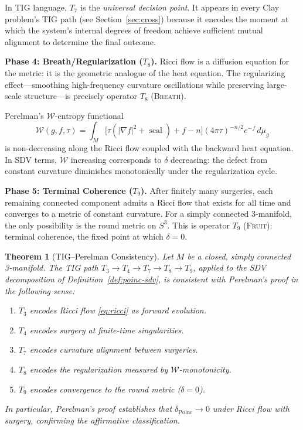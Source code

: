\documentclass[11pt]{article}
\newtheorem{theorem}{Theorem}[section]
\DeclareMathOperator{\scal}{scal}
\begin{document}
In TIG language, $T_7$ is the \emph{universal decision point}.  It
appears in every Clay problem's TIG path (see Section~\ref{sec:cross})
because it encodes the moment at which the system's internal degrees
of freedom achieve sufficient mutual alignment to determine the final
outcome.

\medskip
\noindent
\textbf{Phase 4: Breath/Regularization ($T_8$).}
Ricci flow is a diffusion equation for the metric: it is the geometric
analogue of the heat equation.  The regularizing effect---smoothing
high-frequency curvature oscillations while preserving large-scale
structure---is precisely operator $T_8$ (\textsc{Breath}).

Perelman's $\mathcal{W}$-entropy functional \cite{Per1}
\begin{equation}
\label{eq:W}
\mathcal{W}(g, f, \tau) = \int_M
\bigl[\tau(|\nabla f|^2 + \scal) + f - n\bigr]
(4\pi\tau)^{-n/2} e^{-f}\, d\mu_g
\end{equation}
is non-decreasing along the Ricci flow coupled with the backward heat
equation.  In SDV terms, $\mathcal{W}$ increasing corresponds to
$\delta$ decreasing: the defect from constant curvature diminishes
monotonically under the regularization cycle.

\medskip
\noindent
\textbf{Phase 5: Terminal Coherence ($T_9$).}
After finitely many surgeries, each remaining connected component
admits a Ricci flow that exists for all time and converges to a
metric of constant curvature.  For a simply connected 3-manifold,
the only possibility is the round metric on $S^3$.  This is operator
$T_9$ (\textsc{Fruit}): terminal coherence, the fixed point at which
$\delta = 0$.

\begin{theorem}[TIG--Perelman Consistency]
\label{thm:consistency}
Let $M$ be a closed, simply connected 3-manifold.  The TIG path
$T_3 \to T_4 \to T_7 \to T_8 \to T_9$, applied to the SDV
decomposition of Definition~\ref{def:poinc-sdv}, is consistent with
Perelman's proof in the following sense:
\begin{enumerate}
\item $T_3$ encodes Ricci flow \eqref{eq:ricci} as forward evolution.
\item $T_4$ encodes surgery at finite-time singularities.
\item $T_7$ encodes curvature alignment between surgeries.
\item $T_8$ encodes the regularization measured by
$\mathcal{W}$-monotonicity.
\item $T_9$ encodes convergence to the round metric ($\delta = 0$).
\end{enumerate}
In particular, Perelman's proof establishes that
$\delta_{\mathrm{Poinc}} \to 0$ under Ricci flow with surgery,
confirming the affirmative classification.
\end{theorem}
\end{document}
